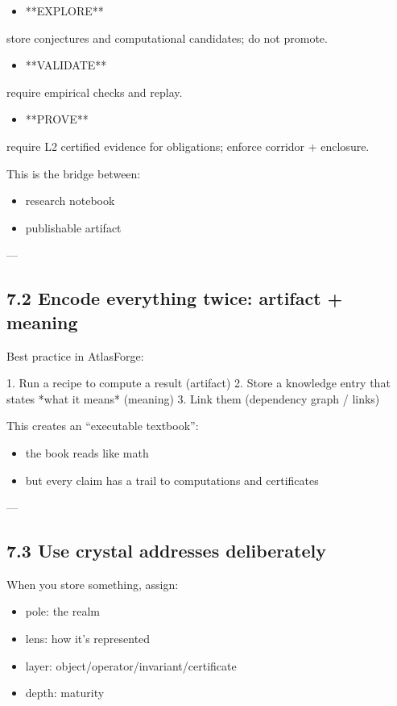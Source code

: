 \documentclass[11pt]{article}
\begin{document}
\begin{itemize}
\item **EXPLORE**
\end{itemize}
  store conjectures and computational candidates; do not promote.

\begin{itemize}
\item **VALIDATE**
\end{itemize}
  require empirical checks and replay.

\begin{itemize}
\item **PROVE**
\end{itemize}
  require L2 certified evidence for obligations; enforce corridor + enclosure.

This is the bridge between:
\begin{itemize}
\item research notebook
\item publishable artifact
\end{itemize}

---

\subsection{7.2 Encode everything twice: artifact + meaning}

Best practice in AtlasForge:

1. Run a recipe to compute a result (artifact)
2. Store a knowledge entry that states *what it means* (meaning)
3. Link them (dependency graph / links)

This creates an “executable textbook”:
\begin{itemize}
\item the book reads like math
\item but every claim has a trail to computations and certificates
\end{itemize}

---

\subsection{7.3 Use crystal addresses deliberately}

When you store something, assign:

\begin{itemize}
\item pole: the realm
\item lens: how it’s represented
\item layer: object/operator/invariant/certificate
\item depth: maturity
\end{itemize}
\end{document}
